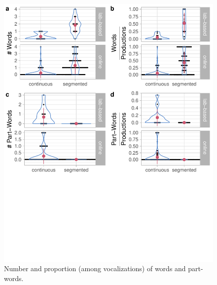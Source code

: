 \documentclass[]{article}
\begin{document}
\begin{figure}

{\centering \includegraphics[width=0.8\linewidth]{segmentation_recall_combined_files/figure-latex/recall-words-part-words-raw-plot-1} 

}

\caption{Number and proportion (among vocalizations) of words and part-words.}\label{fig:recall-words-part-words-raw-plot}
\end{figure}
\end{document}
